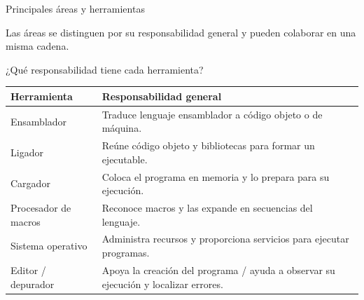\documentclass[11pt,spanish]{beamer}
\begin{document}
\begin{frame}{Principales áreas y herramientas}
\vfill

\begin{center}
\end{center}

\bigskip

\begin{center}
\small Las áreas se distinguen por su responsabilidad general y pueden colaborar en una misma cadena.
\end{center}

\vfill
\end{frame}

\begin{frame}{¿Qué responsabilidad tiene cada herramienta?}
\vfill

\begin{center}
\scriptsize
\renewcommand{\arraystretch}{1.12}
\begin{tabular}{|L{.26\textwidth}|L{.59\textwidth}|}
\hline
\textbf{Herramienta} & \textbf{Responsabilidad general} \tabularnewline
\hline
Ensamblador & Traduce lenguaje ensamblador a código objeto o de máquina. \tabularnewline
\hline
Ligador & Reúne código objeto y bibliotecas para formar un ejecutable. \tabularnewline
\hline
Cargador & Coloca el programa en memoria y lo prepara para su ejecución. \tabularnewline
\hline
Procesador de macros & Reconoce macros y las expande en secuencias del lenguaje. \tabularnewline
\hline
Sistema operativo & Administra recursos y proporciona servicios para ejecutar programas. \tabularnewline
\hline
Editor / depurador & Apoya la creación del programa / ayuda a observar su ejecución y localizar errores. \tabularnewline
\hline
\end{tabular}
\end{center}

\vfill
\end{frame}
\end{document}
